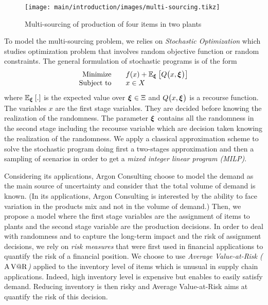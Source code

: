 \begin{figure}[!ht]
  \centering
  \texttt{[image: main/introduction/images/multi-sourcing.tikz]}
  \caption{Multi-sourcing of production of four items in two plants}
  \label{fig:intro:en:multi-sourcing}
\end{figure}


\medskip


To model the multi-sourcing problem, we relies on \emph{Stochastic Optimization} which studies optimization problem that involves random objective function or random constraints.
The general formulation of stochastic programs is of the form
\begin{equation}
\begin{array}{rl}
  \mbox{Minimize} \quad & f(x) + \espe_{\va\xi}\sqbracket{Q\bracket{x,\va\xi}} \\
  \mbox{Subject to} \quad & x \in X
\end{array}
\end{equation}
where $\espe_{\va\xi}\sqbracket{.}$ is the expected value over $\va\xi\in\Xi$ and $Q\bracket{x,\va\xi}$ is a recourse function.
The variables $x$ are the first stage variables.
They are decided before knowing the realization of the randomness.
The parameter $\va\xi$ contains all the randomness in the second stage including the recourse variable which are decision taken knowing the realization of the randomness.
We apply a classical approximation scheme to solve the stochastic program doing first a two-stages approximation and then a sampling of scenarios in order to get a \emph{mixed integer linear program (MILP)}.


\medskip


Considering its applications, Argon Consulting choose to model the demand as the main source of uncertainty and consider that the total volume of demand is known.
(In its applications, Argon Consulting is interested by the ability to face variation in the products mix and not in the volume of demand.)
Then, we propose a model where the first stage variables are the assignment of items to plants and the second stage variable are the production decisions.
In order to deal with randomness and to capture the long-term impact and the risk of assignment decisions, we rely on \emph{risk measures} that were first used in financial applications to quantify the risk of a financial position.
We choose to use \emph{Average Value-at-Risk ($\operatorname{A\operatorname{V@R}}$)} applied to the inventory level of items which is unusual in supply chain applications.
Indeed, high inventory level is expensive but enables to easily satisfy demand.
Reducing inventory is then risky and Average Value-at-Risk aims at quantify the risk of this decision.


